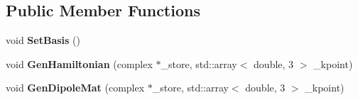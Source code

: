 \subsection*{Public Member Functions}
\begin{DoxyCompactItemize}
\item 
\mbox{\label{class_haldane_aa7de0a9b020461f249da2ca08013358e}} 
void {\bfseries Set\+Basis} ()
\item 
\mbox{\label{class_haldane_a7251dde8e329fd8741ca7309e6e4ab32}} 
void {\bfseries Gen\+Hamiltonian} (complex $\ast$\+\_\+store, std\+::array$<$ double, 3 $>$ \+\_\+kpoint)
\item 
\mbox{\label{class_haldane_aaf3bed088fd25cc4bfc16f85543c45d2}} 
void {\bfseries Gen\+Dipole\+Mat} (complex $\ast$\+\_\+store, std\+::array$<$ double, 3 $>$ \+\_\+kpoint)
\end{DoxyCompactItemize}
